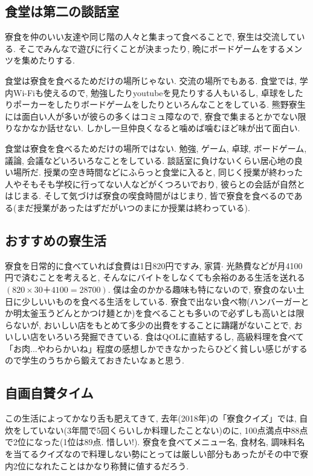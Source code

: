 \documentclass[10pt,b5jsbook,dvips,dvipdfmx,openany]{jsbook}
\theoremstyle{definition}
\begin{document}
		\subsection{食堂は第二の談話室}
		寮食を仲のいい友達や同じ階の人々と集まって食べることで, 寮生は交流している. そこでみんなで遊びに行くことが決まったり, 晩にボードゲームをするメンツを集めたりする.

		食堂は寮食を食べるためだけの場所じゃない. 交流の場所でもある. 食堂では, 学内Wi-Fiも使えるので, 勉強したりyoutubeを見たりする人もいるし, 卓球をしたりポーカーをしたりボードゲームをしたりといろんなことをしている. 熊野寮生には面白い人が多いが彼らの多くはコミュ障なので, 寮食で集まるとかでない限りなかなか話せない. しかし一旦仲良くなると噛めば噛むほど味が出て面白い.

		食堂は寮食を食べるためだけの場所ではない. 勉強, ゲーム, 卓球, ボードゲーム, 議論, 会議などいろいろなことをしている. 談話室に負けないくらい居心地の良い場所だ. 授業の空き時間などにふらっと食堂に入ると, 同じく授業が終わった人やそもそも学校に行ってない人などがくつろいでおり, 彼らとの会話が自然とはじまる. そして気づけば寮食の喫食時間がはじまり, 皆で寮食を食べるのである(まだ授業があったはずだがいつのまにか授業は終わっている).

		\subsection{おすすめの寮生活}
		寮食を日常的に食べていれば食費は1日820円ですみ, 家賃$ \cdot $ 光熱費などが月4100円で済むことを考えると, そんなにバイトをしなくても余裕のある生活を送れる$(820×30＋4100=28700)$. 僕は金のかかる趣味も特にないので, 寮食のない土日に少しいいものを食べる生活をしている. 寮食で出ない食べ物(ハンバーガーとか明太釜玉うどんとかつけ麺とか)を食べることも多いので必ずしも高いとは限らないが, おいしい店をもとめて多少の出費をすることに躊躇がないことで, おいしい店をいろいろ発掘できている. 食はQOLに直結するし, 高級料理を食べて「お肉...やわらかいね」程度の感想しかできなかったらひどく貧しい感じがするので学生のうちから鍛えておきたいなぁと思う.

		\subsection{自画自賛タイム}
		この生活によってかなり舌も肥えてきて, 去年(2018年)の「寮食クイズ」では, 自炊をしていない(3年間で5回くらいしか料理したことない)のに, 100点満点中88点で2位になった(1位は89点. 惜しい!). 寮食を食べてメニュー名, 食材名, 調味料名を当てるクイズなので料理しない勢にとっては厳しい部分もあったがその中で寮内2位になれたことはかなり称賛に値するだろう.
\end{document}
